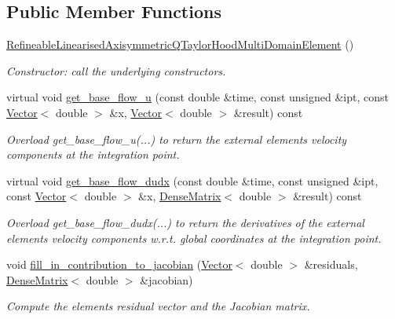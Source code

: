 \subsection*{Public Member Functions}
\begin{DoxyCompactItemize}
\item 
\hyperlink{classRefineableLinearisedAxisymmetricQTaylorHoodMultiDomainElement_a449140eab46a0e96a3ee1ad0f9481ffe}{Refineable\+Linearised\+Axisymmetric\+Q\+Taylor\+Hood\+Multi\+Domain\+Element} ()
\begin{DoxyCompactList}\small\item\em Constructor\+: call the underlying constructors. \end{DoxyCompactList}\item 
virtual void \hyperlink{classRefineableLinearisedAxisymmetricQTaylorHoodMultiDomainElement_aa1337108dab29eed1dc7b27d8f15382a}{get\+\_\+base\+\_\+flow\+\_\+u} (const double \&time, const unsigned \&ipt, const \hyperlink{classoomph_1_1Vector}{Vector}$<$ double $>$ \&x, \hyperlink{classoomph_1_1Vector}{Vector}$<$ double $>$ \&result) const
\begin{DoxyCompactList}\small\item\em Overload get\+\_\+base\+\_\+flow\+\_\+u(...) to return the external element\textquotesingle{}s velocity components at the integration point. \end{DoxyCompactList}\item 
virtual void \hyperlink{classRefineableLinearisedAxisymmetricQTaylorHoodMultiDomainElement_ab93338e4fda9be14f7f1c34824ddc905}{get\+\_\+base\+\_\+flow\+\_\+dudx} (const double \&time, const unsigned \&ipt, const \hyperlink{classoomph_1_1Vector}{Vector}$<$ double $>$ \&x, \hyperlink{classoomph_1_1DenseMatrix}{Dense\+Matrix}$<$ double $>$ \&result) const
\begin{DoxyCompactList}\small\item\em Overload get\+\_\+base\+\_\+flow\+\_\+dudx(...) to return the derivatives of the external element\textquotesingle{}s velocity components w.\+r.\+t. global coordinates at the integration point. \end{DoxyCompactList}\item 
void \hyperlink{classRefineableLinearisedAxisymmetricQTaylorHoodMultiDomainElement_a057d824e17f4e7ed12b496629dfe67fd}{fill\+\_\+in\+\_\+contribution\+\_\+to\+\_\+jacobian} (\hyperlink{classoomph_1_1Vector}{Vector}$<$ double $>$ \&residuals, \hyperlink{classoomph_1_1DenseMatrix}{Dense\+Matrix}$<$ double $>$ \&jacobian)
\begin{DoxyCompactList}\small\item\em Compute the element\textquotesingle{}s residual vector and the Jacobian matrix. \end{DoxyCompactList}\end{DoxyCompactItemize}
